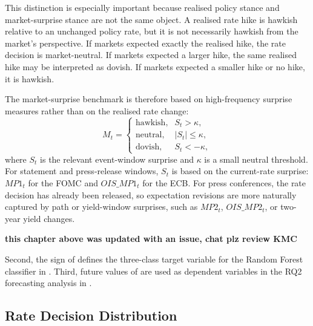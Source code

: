 This distinction is especially important because realised policy stance
and market-surprise stance are not the same object. A realised rate hike
is hawkish relative to an unchanged policy rate, but it is not necessarily
hawkish from the market's perspective. If markets expected exactly the
realised hike, the rate decision is market-neutral. If markets expected a
larger hike, the same realised hike may be interpreted as dovish. If
markets expected a smaller hike or no hike, it is hawkish.

The market-surprise benchmark is therefore based on high-frequency
surprise measures rather than on the realised rate change:
\[
M_t =
\begin{cases}
\text{hawkish}, & S_t > \kappa,\\
\text{neutral}, & |S_t| \leq \kappa,\\
\text{dovish},  & S_t < -\kappa,
\end{cases}
\]
where \(S_t\) is the relevant event-window surprise and \(\kappa\) is a
small neutral threshold. For statement and press-release windows,
\(S_t\) is based on the current-rate surprise: \(MP1_t\) for the FOMC
and \(OIS\_MP1_t\) for the ECB. For press conferences, the rate decision
has already been released, so expectation revisions are more naturally
captured by path or yield-window surprises, such as \(MP2_t\),
\(OIS\_MP2_t\), or two-year yield changes.

\textbf{this chapter above was updated with an issue, chat plz review KMC}


Second, the sign of \bpschange{} defines the three-class target variable
for the Random Forest classifier in . Third, future
values of \bpschange{} are used as dependent variables in the RQ2
forecasting analysis in .

\subsection{Rate Decision Distribution}
\label{sec:data_rate_distribution}

